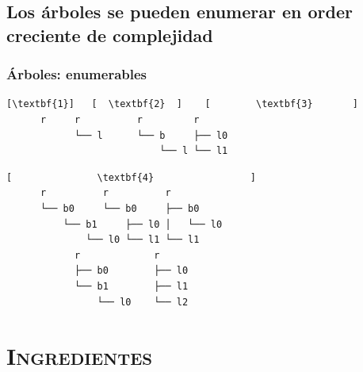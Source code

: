 \documentclass[xcolor=x11names,compress]{beamer}
\renewcommand{\(}{\begin{columns}}
\renewcommand{\)}{\end{columns}}
\newcommand{\<}[1]{\begin{column}{#1}}
\renewcommand{\>}{\end{column}}
\begin{document}
\subsection{Los árboles se pueden enumerar en order creciente de complejidad \pause}
\begin{frame}[fragile]
    \frametitle{Árboles: enumerables}
\begin{Verbatim}[commandchars=\\\{\},codes={\catcode`$=3\catcode`_=8}]
     [\textbf{1}]   [  \textbf{2}  ]    [        \textbf{3}       ]
      r     r          r         r
            └── l      └── b     ├── l0
                           └── l └── l1
\end{Verbatim}

\pause

\begin{Verbatim}[commandchars=\\\{\},codes={\catcode`$=3\catcode`_=8}]
     [               \textbf{4}                 ]
      r          r          r         
      └── b0     └── b0     ├── b0    
          └── b1     ├── l0 │   └── l0
              └── l0 └── l1 └── l1    
            r             r
            ├── b0        ├── l0
            └── b1        ├── l1
                └── l0    └── l2
\end{Verbatim}



\end{frame}

\section{\scshape Ingredientes}
\end{document}
